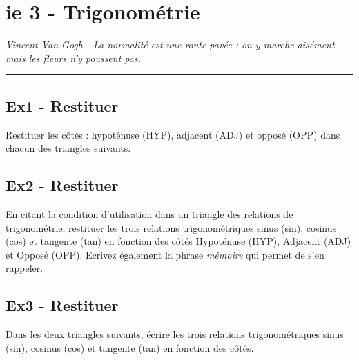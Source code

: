 \documentclass[12pt]{article}
\newcommand{\horrule}[1]{\rule{\linewidth}{#1}} %
\begin{document}

\newtheorem{Definition}{Définition}
\newtheorem{Theorem}{Théorème}
\newtheorem{Proposition}{Propriété}

\renewcommand{\labelitemi}{$\bullet$}
\renewcommand{\labelitemii}{$\circ$}

\setlength{\columnseprule}{1pt}

\section*{ie 3 - Trigonométrie}
\begin{center}
  \textit{Vincent Van Gogh - La normalité est une route pavée : on y marche aisément mais les fleurs n’y poussent pas.}
\end{center}
\horrule{2px}

\subsection*{Ex1 - Restituer}

Restituer les côtés : hypoténuse (HYP), adjacent (ADJ) et opposé (OPP) dans chacun des triangles suivants.

\subsection*{Ex2 - Restituer}

En citant la condition d'utilisation dans un triangle des relations de trigonométrie, restituer les trois relations trigonométriques sinus (sin), cosinus (cos) et tangente (tan) en fonction des côtés Hypoténuse (HYP), Adjacent (ADJ) et Opposé (OPP). Ecrivez également la phrase \textit{mémoire} qui permet de s'en rappeler.

\subsection*{Ex3 - Restituer}

Dans les deux triangles suivants, écrire les trois relations trigonométriques sinus (sin), cosinus (cos) et tangente (tan) en fonction des côtés.
\end{document}
